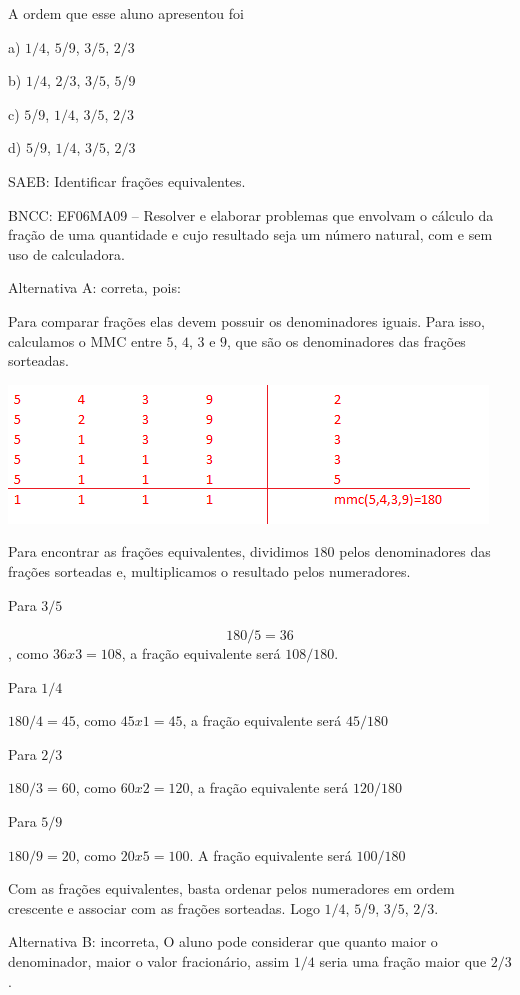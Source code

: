 A ordem que esse aluno apresentou foi

a) $1/4$, $5$/9, $3/5$, $2/3$

b) $1/4$, $2/3$, $3/5$, $5$/9

c) $5$/9, $1/4$, $3/5$, $2/3$

d) $5$/9, $1/4$, $3/5$, $2/3$

SAEB: Identificar frações equivalentes.

BNCC: EF06MA09 -- Resolver e elaborar problemas que envolvam o cálculo
da fração de uma quantidade e cujo resultado seja um número natural, com
e sem uso de calculadora.

Alternativa A: correta, pois:

Para comparar frações elas devem possuir os denominadores iguais. Para
isso, calculamos o MMC entre $5$, $4$, $3$ e $9$, que são os denominadores das
frações sorteadas.

\includegraphics[width=5.01042in,height=1.44792in]{./imgSAEB_6_MAT/media/image36.png}

Para encontrar as frações equivalentes, dividimos $180$ pelos
denominadores das frações sorteadas e, multiplicamos o resultado pelos
numeradores.

Para $3/5$

$$180 / 5 = 36$$, como $36 x 3 = 108$, a fração equivalente será $108 / 180$.

Para $1/4$

$180/4 = 45$, como $45 x 1 = 45$, a fração equivalente será $45/180$

Para $2/3$

$180/3 = 60$, como $60 x 2 = 120$, a fração equivalente será $120/180$

Para $5/9$

$180/9 = 20$, como $20 x 5 = 100$. A fração equivalente será $100/180$

Com as frações equivalentes, basta ordenar pelos numeradores em ordem
crescente e associar com as frações sorteadas. Logo $1/4$, $5$/9, $3/5$, $2/3$.

Alternativa B: incorreta, O aluno pode considerar que quanto maior o
denominador, maior o valor fracionário, assim $1/4$ seria uma fração maior
que $2/3$.

